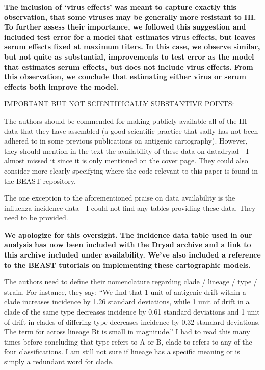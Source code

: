 \documentclass[11pt,oneside,letterpaper]{article}
\begin{document}
\textbf{The inclusion of `virus effects' was meant to capture exactly this observation, that some viruses may be generally more resistant to HI. To further assess their importance, we followed this suggestion and included test error for a model that estimates virus effects, but leaves serum effects fixed at maximum titers. In this case, we observe similar, but not quite as substantial, improvements to test error as the model that estimates serum effects, but does not include virus effects.  From this observation, we conclude that estimating either virus or serum effects both improve the model.}

IMPORTANT BUT NOT SCIENTIFICALLY SUBSTANTIVE POINTS: 

The authors should be commended for making publicly available all of the HI data that they have assembled (a good scientific practice that sadly has not been adhered to in some previous publications on antigenic cartography). However, they should mention in the text the availability of these data on datadryad - I almost missed it since it is only mentioned on the cover page. They could also consider more clearly specifying where the code relevant to this paper is found in the BEAST repository.

The one exception to the aforementioned praise on data availability is the influenza incidence data - I could not find any tables providing these data. They need to be provided.

\textbf{We apologize for this oversight.  The incidence data table used in our analysis has now been included with the Dryad archive and a link to this archive included under availability.  We've also included a reference to the BEAST tutorials on implementing these cartographic models.}

The authors need to define their nomenclature regarding clade / lineage / type / strain. For instance, they say: ``We find that 1 unit of antigenic drift within a clade increases incidence by 1.26 standard deviations, while 1 unit of drift in a clade of the same type decreases incidence by 0.61 standard deviations and 1 unit of drift in clades of differing type decreases incidence by 0.32 standard deviations. The term for across lineage Bt is small in magnitude.'' I had to read this many times before concluding that type refers to A or B, clade to refers to any of the four classifications. I am still not sure if lineage has a specific meaning or is simply a redundant word for clade.
\end{document}
